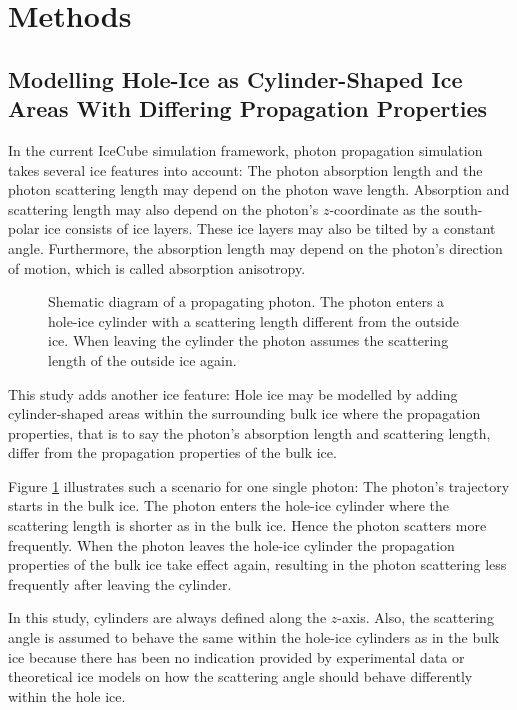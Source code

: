 
\section{Methods}
\label{sec:methods}

\subsection{Modelling Hole-Ice as Cylinder-Shaped Ice Areas With Differing Propagation Properties}

In the current IceCube simulation framework, photon propagation simulation takes several ice features into account: The photon absorption length and the photon scattering length may depend on the photon wave length. Absorption and scattering length may also depend on the photon's $z$-coordinate as the south-polar ice consists of ice layers. These ice layers may also be tilted by a constant angle. Furthermore, the absorption length may depend on the photon's direction of motion, which is called absorption anisotropy.

\begin{figure}[htb]
  \label{fig:aiw2Thah}
  \caption{Shematic diagram of a propagating photon. The photon enters a hole-ice cylinder with a scattering length different from the outside ice. When leaving the cylinder the photon assumes the scattering length of the outside ice again.}
\end{figure}

This study adds another ice feature: Hole ice may be modelled by adding cylinder-shaped areas within the surrounding bulk ice where the propagation properties, that is to say the photon's absorption length and scattering length, differ from the propagation properties of the bulk ice.

Figure \ref{fig:aiw2Thah} illustrates such a scenario for one single photon: The photon's trajectory starts in the bulk ice. The photon enters the hole-ice cylinder where the scattering length is shorter as in the bulk ice. Hence the photon scatters more frequently. When the photon leaves the hole-ice cylinder the propagation properties of the bulk ice take effect again, resulting in the photon scattering less frequently after leaving the cylinder.

In this study, cylinders are always defined along the $z$-axis. Also, the scattering angle is assumed to behave the same within the hole-ice cylinders as in the bulk ice because there has been no indication provided by experimental data or theoretical ice models on how the scattering angle should behave differently within the hole ice. 

